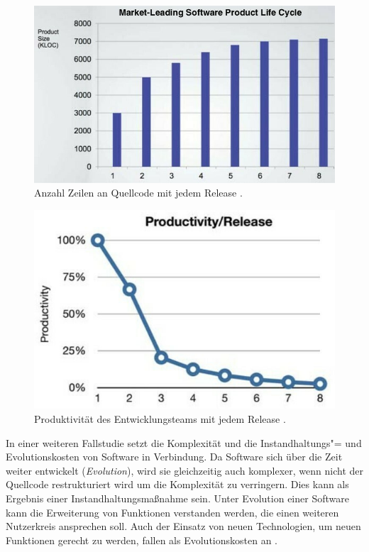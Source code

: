 \begin{figure}
  \centering
  \includegraphics[width=.6\textwidth]{res/kloc_releases.jpg}
   \caption{Anzahl Zeilen an Quellcode mit jedem Release \citep[][6]{martin2018}.}
   \label{fig:kloc_rel}
\end{figure}


\begin{figure}
  \centering
  \includegraphics[width=.6\textwidth]{res/productivity_releases.jpg}
   \caption{Produktivität des Entwicklungsteams mit jedem Release \citep[][8]{martin2018}.}
   \label{fig:prod_rel}
\end{figure}


In einer weiteren Fallstudie setzt  die Komplexität und die Instandhaltungs"= und Evolutionskosten von Software in Verbindung. Da Software sich über die Zeit weiter entwickelt (\textit{Evolution}), wird sie gleichzeitig auch komplexer, wenn nicht der Quellcode restrukturiert wird um die Komplexität zu verringern. Dies kann \zb als Ergebnis einer Instandhaltungsmaßnahme sein. Unter Evolution einer Software kann die Erweiterung von Funktionen verstanden werden, die einen weiteren Nutzerkreis ansprechen soll. Auch der Einsatz von neuen Technologien, um neuen Funktionen gerecht zu werden, fallen als Evolutionskosten an \citep[vgl.][3]{Ogheneovo2014}.

